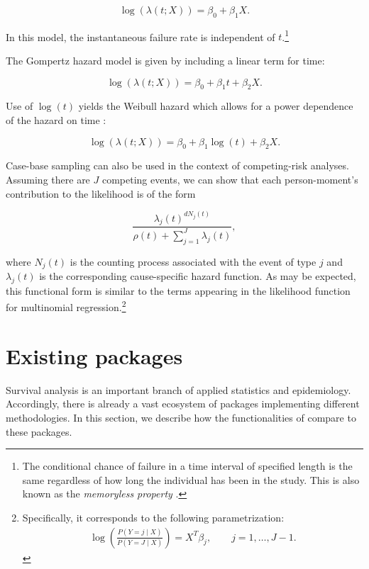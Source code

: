\documentclass[
]{jss}
\begin{document}
\begin{equation}
\log(\lambda(t; X)) = \beta_0 + \beta_1 X. \label{eq:exp}
\end{equation}

In this model, the instantaneous failure rate is independent of
\(t\).\footnote{The conditional chance of failure in a time interval of specified length is the same regardless of how long the individual has been in the study. This is also known as the \textit{memoryless property} \citep{kalbfleisch2011statistical}.}

The Gompertz hazard model is given by including a linear term for time:

\begin{equation}
\log(\lambda(t; X)) = \beta_0 + \beta_1 t + \beta_2 X. \label{eq:gomp}
\end{equation}

Use of \(\log(t)\) yields the Weibull hazard which allows for a power
dependence of the hazard on time \citep{kalbfleisch2011statistical}:

\begin{equation}
\log(\lambda(t; X)) = \beta_0 + \beta_1 \log(t) + \beta_2 X. \label{eq:weibull}
\end{equation}

Case-base sampling can also be used in the context of competing-risk
analyses. Assuming there are \(J\) competing events, we can show that
each person-moment's contribution to the likelihood is of the form

\[\frac{\lambda_j(t)^{dN_j(t)}}{\rho(t) + \sum_{j=1}^J\lambda_j(t)},\]

where \(N_j(t)\) is the counting process associated with the event of
type \(j\) and \(\lambda_j(t)\) is the corresponding cause-specific
hazard function. As may be expected, this functional form is similar to
the terms appearing in the likelihood function for multinomial
regression.\footnote{Specifically, it corresponds to the following parametrization: \begin{align*} \log\left(\frac{P(Y=j \mid X)}{P(Y = J \mid X)}\right) = X^T\beta_j, \qquad j = 1,\ldots, J-1.\end{align*}}

\hypertarget{existing-packages}{%
\section{Existing packages}\label{existing-packages}}

Survival analysis is an important branch of applied statistics and
epidemiology. Accordingly, there is already a vast ecosystem of 
packages implementing different methodologies. In this section, we
describe how the functionalities of  compare to these
packages.
\end{document}
